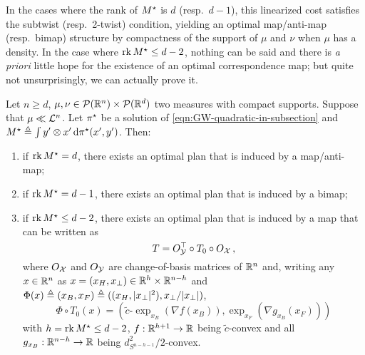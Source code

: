             In the cases where the rank of $M^\star$ is $d$ (resp.~$d-1$), this linearized cost satisfies the subtwist (resp.~2-twist) condition, yielding an optimal map/anti-map (resp.~bimap) structure by compactness of the support of $\mu$ and $\nu$ when $\mu$ has a density. In the case where $\operatorname*{rk} M^\star\leq d-2$, nothing can be said and there is \textit{a priori} little hope for the existence of an optimal correspondence map; but quite not unsurprisingly, we can actually prove it.
            \begin{theorem}
                \label{theorem:quad-main}
                Let $n\geq d$, $\mu, \nu\in \mathcal{P}(\mathbb{R}^n)\times\mathcal{P}(\mathbb{R}^d)$ two measures with compact supports. Suppose that $\mu\ll\mathcal{L}^n$. Let $\pi^\star$ be a solution of \cref{eqn:GW-quadratic-in-subsection} and $M^\star\triangleq\int y'\otimes x' \,\mathrm d\pi^\star(x', y')$. Then:
                \begin{enumerate}[label=(\roman*)]
                    \item if $\operatorname*{rk} M^\star=d$, there exists an optimal plan that is induced by a map/anti-map;
                    \item if $\operatorname*{rk} M^\star=d-1$, there exists an optimal plan that is induced by a bimap;
                    \item if $\operatorname*{rk} M^\star\leq d-2$, there exists an optimal plan that is induced by a map that can be written as
                        \begin{equation*}
                            T=\smash{O_{\mathcal{Y}}^\top} \circ T_0\circ O_{\mathcal{X}}\,,
                        \end{equation*}
                        where $O_{\mathcal{X}}$ and $O_{\mathcal{Y}}$ are change-of-basis matrices of $\mathbb{R}^n$ and, writing any $x\in\mathbb{R}^n$ as $x=(x_H,x_\perp)\in\mathbb{R}^h\times\mathbb{R}^{n-h}$ and $\Phi(x)\triangleq (x_B,x_F)\triangleq ((x_H,|x_\perp|^2),x_\perp/|x_\perp|)$,
                        \begin{equation*}
                            \Phi\circ T_0(x)=\left(\tilde c\text{-}\exp_{x_B}(\nabla f(x_B)), \exp_{x_F}(\nabla g_{x_B}(x_F))\right)
                        \end{equation*}
                        with $h=\operatorname*{rk} M^\star\leq d-2$, $f: \mathbb{R}^{h+1} \to \mathbb{R}$ being $\tilde c$-convex and all $g_{x_B}: \mathbb{R}^{n-h} \to \mathbb{R}$ being $d_{S^{n-h-1}}^2/2$-convex.
                \end{enumerate}
            \end{theorem}
